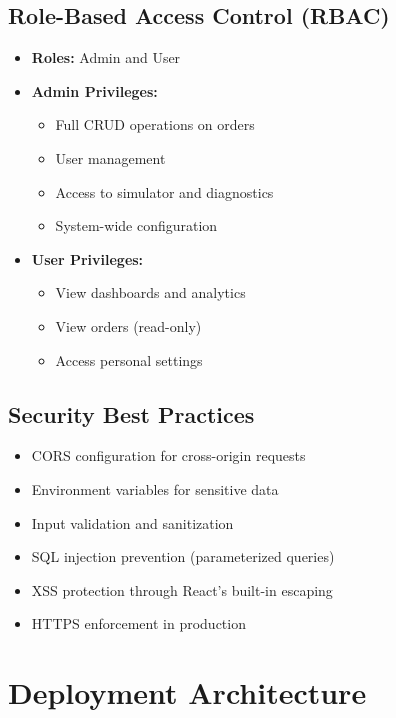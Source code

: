 \documentclass[12pt,a4paper]{article}
\begin{document}
\subsection{Role-Based Access Control (RBAC)}

\begin{itemize}[leftmargin=*]
    \item \textbf{Roles:} Admin and User
    \item \textbf{Admin Privileges:}
    \begin{itemize}
        \item Full CRUD operations on orders
        \item User management
        \item Access to simulator and diagnostics
        \item System-wide configuration
    \end{itemize}
    \item \textbf{User Privileges:}
    \begin{itemize}
        \item View dashboards and analytics
        \item View orders (read-only)
        \item Access personal settings
    \end{itemize}
\end{itemize}

\subsection{Security Best Practices}

\begin{itemize}[leftmargin=*]
    \item CORS configuration for cross-origin requests
    \item Environment variables for sensitive data
    \item Input validation and sanitization
    \item SQL injection prevention (parameterized queries)
    \item XSS protection through React's built-in escaping
    \item HTTPS enforcement in production
\end{itemize}

\newpage

\section{Deployment Architecture}
\end{document}
